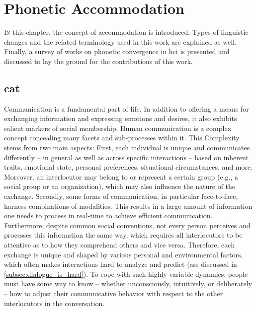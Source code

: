 \chapter{Phonetic Accommodation}
\label{chap:phonetic_convergence}

\lettrine{I}{n} this chapter, the concept of accommodation is introduced.
Types of linguistic changes and the related terminology used in this work are explained as well.
Finally, a survey of works on phonetic convergence in \acl{hci} is presented and discussed to lay the ground for the contributions of this work.

\pagebreak

\acresetall

\section{\Acl{cat}}
\label{sec:communication_accommodation_theory}

Communication is a fundamental part of life.
In addition to offering a means for exchanging information and expressing emotions and desires, it also exhibits salient markers of social membership.
Human communication is a complex concept concealing many facets and sub-processes within it.
This Complexity stems from two main aspects:
First, each individual is unique and communicates differently -- in general as well as across specific interactions -- based on inherent traits, emotional state, personal preferences, situational circumstances, and more.
Moreover, an interlocutor may belong to or represent a certain group (e.g., a social group or an organization), which may also influence the nature of the exchange.
Secondly, some forms of communication, in particular face-to-face, harness combinations of modalities.
This results in a large amount of information one needs to process in real-time to achieve efficient communication.
Furthermore, despite common social conventions, not every person perceives and processes this information the same way, which requires all interlocutors to be attentive as to how they comprehend others and vice versa.
Therefore, each exchange is unique and shaped by various personal and environmental factors, which often makes interactions hard to analyze and predict (ass discussed in \cref{subsec:dialogue_is_hard}).
To cope with such highly variable dynamics, people must have some way to know -- whether unconsciously, intuitively, or deliberately -- how to adjust their communicative behavior with respect to the other interlocutors in the conversation.


